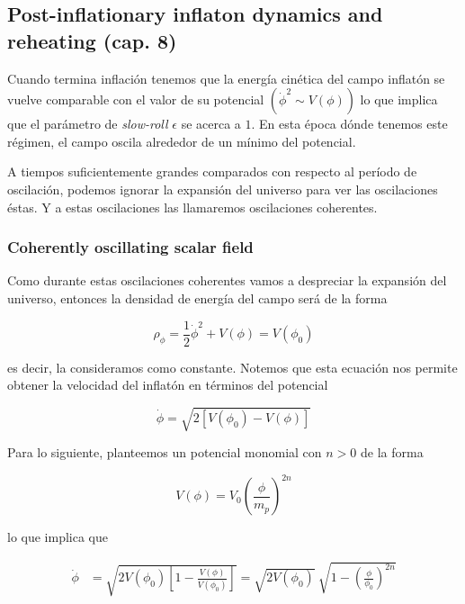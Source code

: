\subsection{Post-inflationary inflaton dynamics and reheating (cap. 8)}

Cuando termina inflación tenemos que la energía cinética del campo inflatón se vuelve comparable con el valor de su potencial $(\dot{\phi}^2 \sim V(\phi))$ lo que implica que el parámetro de \textit{slow-roll} $\epsilon$ se acerca a $1$. En esta época dónde tenemos este régimen, el campo oscila alrededor de un mínimo del potencial.

A tiempos suficientemente grandes comparados con respecto al período de oscilación, podemos ignorar la expansión del universo para ver las oscilaciones éstas. Y a estas oscilaciones las llamaremos oscilaciones coherentes.

\subsubsection{Coherently oscillating scalar field}

Como durante estas oscilaciones coherentes vamos a despreciar la expansión del universo, entonces la densidad de energía del campo será de la forma

\begin{equation}
    \rho_\phi = \frac{1}{2} \dot{\phi}^2 + V(\phi) = V(\phi_0)
\end{equation}

\noindent
es decir, la consideramos como constante. Notemos que esta ecuación nos permite obtener la velocidad del inflatón en términos del potencial

\begin{equation}
    \dot{\phi} = \sqrt{2 \left[ V(\phi_0) - V(\phi) \right]}
\end{equation}

Para lo siguiente, planteemos un potencial monomial con $n > 0$ de la forma

\begin{equation}
    V (\phi) = V_0 \left( \frac{\phi}{m_p} \right)^{2n}
\end{equation}

\noindent
lo que implica que 

\begin{equation}
    \begin{split} 
        \dot{\phi} &= \sqrt{2 V (\phi_0) \left[ 1 - \frac{V(\phi)}{V(\phi_0)} \right]} = \sqrt{2 V(\phi_0)} \ \sqrt{1 - \left( \frac{\phi}{\phi_0} \right)^{2n}}
    \end{split}
\end{equation}


